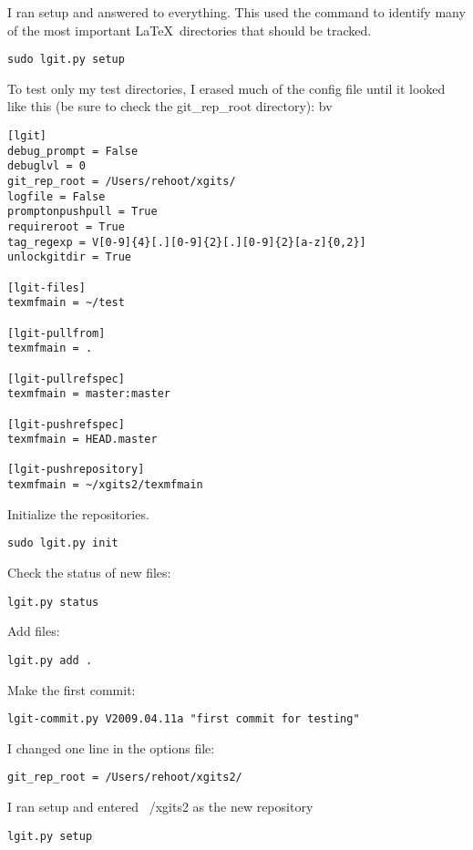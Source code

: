 \documentclass{ltxdoc}
\begin{document}
I ran setup and answered  to everything.  This used the  command to identify many of the most important \LaTeX\ directories that should be tracked.
\begin{verbatim}
sudo lgit.py setup
\end{verbatim}

To test only my test directories, I erased much of the config file until it looked like this (be sure to check the git_rep_root directory):
bv
\begin{verbatim}
[lgit]
debug_prompt = False
debuglvl = 0
git_rep_root = /Users/rehoot/xgits/
logfile = False
promptonpushpull = True
requireroot = True
tag_regexp = V[0-9]{4}[.][0-9]{2}[.][0-9]{2}[a-z]{0,2}]
unlockgitdir = True

[lgit-files]
texmfmain = ~/test

[lgit-pullfrom]
texmfmain = .

[lgit-pullrefspec]
texmfmain = master:master

[lgit-pushrefspec]
texmfmain = HEAD.master

[lgit-pushrepository]
texmfmain = ~/xgits2/texmfmain
\end{verbatim}

Initialize the  repositories.
\begin{verbatim}
sudo lgit.py init
\end{verbatim}

Check the status of new files:
\begin{verbatim}
lgit.py status
\end{verbatim}

Add files:
\begin{verbatim}
lgit.py add .
\end{verbatim}


Make the first commit:
\begin{verbatim}
lgit-commit.py V2009.04.11a "first commit for testing"
\end{verbatim}

I changed one line in the options file:
\begin{verbatim}
git_rep_root = /Users/rehoot/xgits2/
\end{verbatim}

I ran setup and entered ~/xgits2 as the new repository
\begin{verbatim}
lgit.py setup
\end{verbatim}
\end{document}
